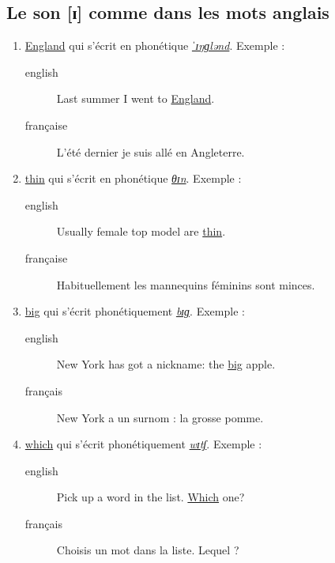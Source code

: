 \subsection{Le son [ɪ] comme dans les mots anglais}
\label{sec:orgf03eb34}
\begin{enumerate}
\item \href{http://www.wordreference.com/enfr/england}{England} qui s'écrit en phonétique \href{https://en.oxforddictionaries.com/definition/england}{\emph{ˈɪŋɡlənd}}. Exemple :
\begin{description}
\item[{english}] \textenglish{Last summer I went to \href{https://youtu.be/QUPBesOdax8}{England}.}
\item[{française}] L'été dernier je suis allé en Angleterre.
\end{description}
\item \href{http://www.wordreference.com/enfr/thin}{thin} qui s'écrit en phonétique \href{https://en.oxforddictionaries.com/definition/thin}{\emph{θɪn}}. Exemple :
\begin{description}
\item[{english}] \textenglish{Usually female top model are \href{https://youtu.be/LekA62H17bo}{thin}.}
\item[{française}] Habituellement les mannequins féminins sont minces.
\end{description}
\item \href{http://www.wordreference.com/enfr/big}{big} qui s'écrit phonétiquement \href{https://en.oxforddictionaries.com/definition/big}{\emph{bɪɡ}}. Exemple :
\begin{description}
\item[{english}] \textenglish{New York has got a nickname: the \href{https://youtu.be/Jha4OkG-ixw}{big} apple.}
\item[{français}] New York a un surnom : la grosse pomme.
\end{description}
\item \href{http://www.wordreference.com/enfr/which}{which} qui s'écrit phonétiquement \href{https://en.oxforddictionaries.com/definition/which}{\emph{wɪtʃ}}. Exemple :
\begin{description}
\item[{english}] \textenglish{Pick up a word in the list. \href{https://youtu.be/5fR\_\_LXDkRg}{Which} one?}
\item[{français}] Choisis un mot dans la liste. Lequel ?
\end{description}
\end{enumerate}

